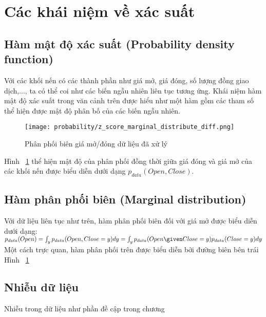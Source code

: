 \section{Các khái niệm về xác suất}
\subsection{Hàm mật độ xác suất (Probability density function)}
Với các khối nến có các thành phần như giá mở, giá đóng, số lượng đồng giao dịch,..., ta có thể coi như các biến ngẫu nhiên liên tục tương ứng. Khái niệm hàm mật độ xác suất trong văn cảnh trên được hiểu như một hàm gồm các tham số thể hiện được mật độ phân bố của các biến ngẫu nhiên.
\begin{figure}[hbt!]
	\centering
	\texttt{[image: probability/z\_score\_marginal\_distribute\_diff.png]}
	\caption{Phân phối biên giá mở/đóng dữ liệu đã xử lý}
	\label{fig:z_score_marginal_distribution_diff}
\end{figure}
\FloatBarrier
Hình ~\ref{fig:z_score_marginal_distribution_diff} thể hiện mật độ của phân phối đồng thời giữa giá đóng và giá mở của các khối nến được biểu diễn dưới dạng $p_{data}(Open, Close)$.
\subsection{Hàm phân phối biên (Marginal distribution)}
Với dữ liệu liên tục như trên, hàm phân phối biên đối với giá mở được biểu diễn dưới dạng:
$p_{data}(Open) = \int_y p_{data}(Open, Close=y) dy = \int_y p_{data}(Open \given Close=y)p_{data}(Close=y)dy$ Một cách trực quan, hàm phân phối trên được biểu diễn bởi đường biên bên trái Hình ~\ref{fig:z_score_marginal_distribution_diff}

\subsection{Nhiễu dữ liệu}
Nhiễu trong dữ liệu như phần đề cập trong chương